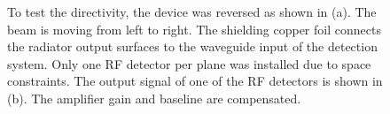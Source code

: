 \begin{figure}[!b]

\centering
{}
\hspace{2mm}
\caption{To test the directivity, the device was reversed as shown in (a). The beam is moving from left to right. The shielding copper foil connects the radiator output surfaces to the waveguide input of the detection system. Only one RF detector per plane was installed due to space constraints. The output signal of one of the RF detectors is shown in (b). The amplifier gain and baseline are compensated.}
\label{fig:reversed_bpm}
\end{figure}

